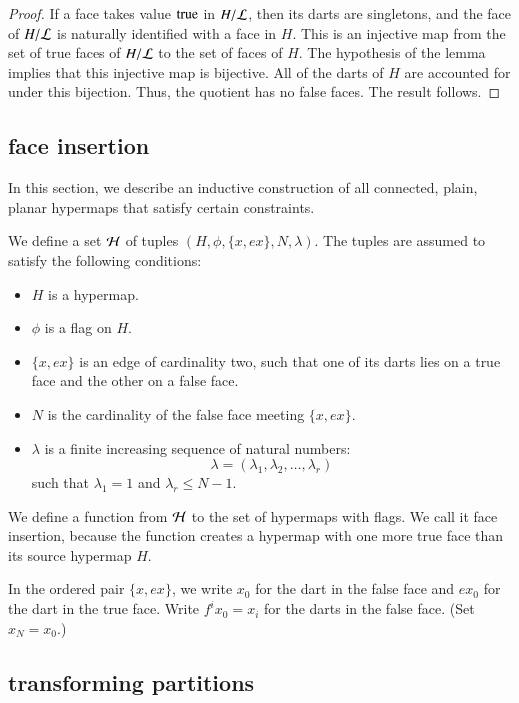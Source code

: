\begin{proof}  If a face takes value ${\operatorname{true}}$ 
in $H/{\cal L}$, then its darts are
singletons, and the face of $H/{\cal L}$ is naturally identified with
 a face in $H$.  This is an injective map from the 
set of true faces of $H/{\cal L}$ to
the set of faces of $H$.  The hypothesis of the lemma implies that this
injective map is bijective.
All of the darts of $H$ are accounted for under this bijection.
Thus, the quotient has no
false faces.  The result follows.
\end{proof}


\subsection{face insertion}


In this section, we describe an inductive construction of all
connected, plain, planar hypermaps that satisfy certain constraints.

We define a set ${\cal H}$ of tuples $(H,\phi,\{x,e x\},N,\lambda)$.
The tuples are assumed to satisfy the following conditions:
\begin{itemize}
    \item $H$ is a hypermap.
    \item $\phi$ is a flag on $H$.
    \item $\{x,e x\}$ is an edge of cardinality two, such that one
    of its darts lies on a true face and the other on a false face.
    \item $N$ is the cardinality of the false face meeting $\{x,e
    x\}$.
    \item $\lambda$ is a finite increasing sequence of natural numbers:
        $$
        \lambda = (\lambda_1,\lambda_2,\ldots,\lambda_r)
        $$
    such that $\lambda_1 = 1$ and $\lambda_r \le N-1$.
\end{itemize}

We define a function from $\cal H$ to the set of hypermaps with
flags.  We call it face insertion, because the function creates a
hypermap with one more true face than its source hypermap $H$.

In the ordered pair $\{x,e x\}$, we write $x_0$ for the dart in the
false face and $e x_0$ for the dart in the true face.  Write $f^i
x_0 = x_i$ for the darts in the false face.  (Set $x_N = x_0$.)

\subsection{transforming partitions}

